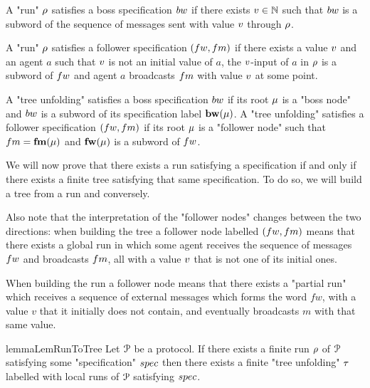 

\begin{definition}
	A "run" $\rho$ satisfies a boss specification $\bossspec$ if there exists $v \in \mathbb{N}$ such that $\bossspec$ is a subword of the sequence of messages sent with value $v$ through $\rho$.
	
	A "run" $\rho$ satisfies a follower specification $(\followwordspec, \followmessagespec)$ if there exists a value $v$ and an agent $a$ such that $v$ is not an initial value of $a$, the $v$-input of $a$ in $\rho$ is a subword of $\followwordspec$ and agent $a$ broadcasts $\followmessagespec$ with value $v$ at some point.
	
	A "tree unfolding" satisfies a boss specification $\bossspec$ if its root $\mu$ is a "boss node" and $\bossspec$ is a subword of its specification label $\mathbf{bw}(\mu)$.
	A "tree unfolding" satisfies a follower specification $(\followwordspec, \followmessagespec)$ if its root $\mu$ is a "follower node" such that $\followmessagespec=\followlabelmessage{\node}$ and  $\mathbf{fw}(\mu)$ is a subword of $\followwordspec$.
\end{definition}

We will now prove that there exists a run satisfying a specification if and only if there exists a finite tree satisfying that same specification. To do so, we will build a tree from a run and conversely.


Also note that the interpretation of the "follower nodes" changes between the two directions: when building the tree a follower node labelled $(\followwordspec, \followmessagespec)$ means that there exists a global run in which some agent receives the sequence of messages $\followwordspec$ and broadcasts $\followmessagespec$, all with a value $v$ that is not one of its initial ones.

When building the run a follower node means that there exists a "partial run" which receives a sequence of external messages which forms the word $fw$, with a value $v$ that it initially does not contain, and eventually broadcasts $m$ with that same value.

\begin{restatable}{lemma}{LemRunToTree}
	\label{lem:run-to-tree}
	Let $\mathcal{P}$ be a protocol.
	If there exists a finite run $\rho$ of $\mathcal{P}$ satisfying some "specification" $\spec$ then there exists a finite "tree unfolding" $\tau$ labelled with local runs of $\mathcal{P}$ satisfying $\spec$. 
\end{restatable}

